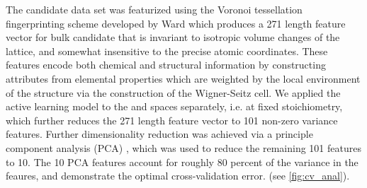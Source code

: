 %
%
The candidate data set was featurized using the Voronoi tessellation fingerprinting scheme developed by Ward  \cite{Ward2017} which produces a \num{271} length feature vector for bulk candidate that is invariant to isotropic volume changes of the lattice, and somewhat insensitive to the precise atomic coordinates.
%
These features encode both chemical and structural information by constructing attributes from elemental properties which are weighted by the local environment of the structure via the construction of the Wigner-Seitz cell.
%
We applied the active learning model to the \IrOtwo and \IrOthree spaces separately, i.e. at fixed stoichiometry, which further reduces the \num{271} length feature vector to \num{101} non-zero variance features.
%
Further dimensionality reduction was achieved via a principle component analysis (PCA) \cite{Tipping1999}, which was used to reduce the remaining \num{101} features to \num{10}.
%
The \num{10} PCA features account for roughly 80 percent of the variance in the feaures, and demonstrate the optimal cross-validation error.
(see \ref{fig:cv_anal}).

